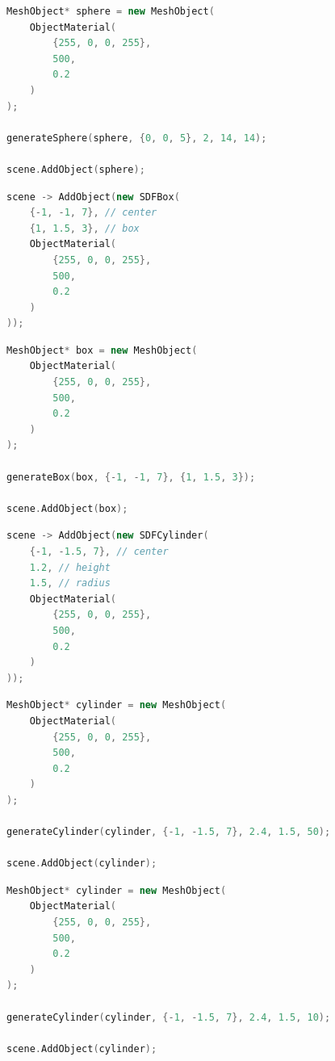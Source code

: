 \documentclass[12pt, a4paper]{article}
\begin{document}
\begin{lstlisting}[language=C++,caption={Test \#1 Highres Mesh}]
MeshObject* sphere = new MeshObject(
	ObjectMaterial(
		{255, 0, 0, 255},
		500,
		0.2
	)
);

generateSphere(sphere, {0, 0, 5}, 2, 14, 14);

scene.AddObject(sphere);

\end{lstlisting}

\begin{lstlisting}[language=C++,caption={Test \#2 SDF}]
scene -> AddObject(new SDFBox(
	{-1, -1, 7}, // center
	{1, 1.5, 3}, // box
	ObjectMaterial(
		{255, 0, 0, 255},
		500,
		0.2
	)
));

\end{lstlisting}

\begin{lstlisting}[language=C++,caption={Test \#2 Mesh}]
MeshObject* box = new MeshObject(
	ObjectMaterial(
		{255, 0, 0, 255},
		500,
		0.2
	)
);

generateBox(box, {-1, -1, 7}, {1, 1.5, 3});

scene.AddObject(box);

\end{lstlisting}

\begin{lstlisting}[language=C++,caption={Test \#3 SDF}]
scene -> AddObject(new SDFCylinder(
	{-1, -1.5, 7}, // center
	1.2, // height
	1.5, // radius
	ObjectMaterial(
		{255, 0, 0, 255},
		500,
		0.2
	)
));
\end{lstlisting}

\begin{lstlisting}[language=C++,caption={Test \#3 Lowres Mesh}]
MeshObject* cylinder = new MeshObject(
	ObjectMaterial(
		{255, 0, 0, 255},
		500,
		0.2
	)
);

generateCylinder(cylinder, {-1, -1.5, 7}, 2.4, 1.5, 50);

scene.AddObject(cylinder);
\end{lstlisting}

\begin{lstlisting}[language=C++,caption={Test \#3 Highres Mesh}]
MeshObject* cylinder = new MeshObject(
	ObjectMaterial(
		{255, 0, 0, 255},
		500,
		0.2
	)
);

generateCylinder(cylinder, {-1, -1.5, 7}, 2.4, 1.5, 10);

scene.AddObject(cylinder);
\end{lstlisting}
\end{document}
